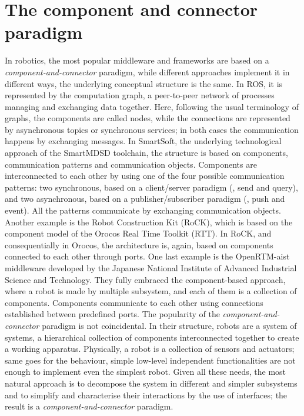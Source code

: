 \minitoc
\newpage

\section[The component and connector paradigm]{The component and connector \\paradigm}
\label{sec:cnc}
In robotics, the most popular middleware and frameworks are based on a \textit{component-and-connector} paradigm, while different approaches implement it in different ways, the underlying conceptual structure is the same. In ROS, it is represented by the computation graph, a peer-to-peer network of processes managing and exchanging data together. Here, following the usual terminology of graphs, the components are called nodes, while the connections are represented by asynchronous topics or synchronous services; in both cases the communication happens by exchanging messages. In SmartSoft, the underlying technological approach of the SmartMDSD toolchain, the structure is based on components, communication patterns and communication objects. Components are interconnected to each other by using one of the four possible communication patterns: two synchronous, based on a client/server paradigm (\ie, send and query), and two asynchronous, based on a publisher/subscriber paradigm (\ie, push and event). All the patterns communicate by exchanging communication objects. Another example is the Robot Construction Kit (RoCK), which is based on the component model of the Orocos Real Time Toolkit (RTT). In RoCK, and consequentially in Orocos, the architecture is, again, based on components connected to each other through ports. One last example is the OpenRTM-aist middleware developed by the Japanese National Institute of Advanced Industrial Science and Technology. They fully embraced the component-based approach, where a robot is made by multiple subsystem, and each of them is a collection of components. Components communicate to each other using connections established between predefined ports. The popularity of the \textit{component-and-connector} paradigm is not coincidental. In their structure, robots are a system of systems, a hierarchical collection of components interconnected together to create a working apparatus. Physically, a robot is a collection of sensors and actuators; same goes for the behaviour, simple low-level independent functionalities are not enough to implement even the simplest robot. Given all these needs, the most natural approach is to decompose the system in different and simpler subsystems and to simplify and characterise their interactions by the use of interfaces; the result is a \textit{component-and-connector} paradigm. 

